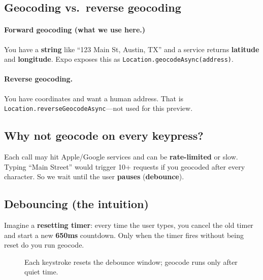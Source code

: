 \documentclass[11pt,a4paper]{article}
\begin{document}
\subsection{Geocoding vs.\ reverse geocoding}

\paragraph{Forward geocoding (what we use here.)}
You have a \textbf{string} like ``123 Main St, Austin, TX'' and a service returns \textbf{latitude} and \textbf{longitude}. Expo exposes this as \texttt{Location.geocodeAsync(address)}.

\paragraph{Reverse geocoding.}
You have coordinates and want a human address. That is \texttt{Location.reverseGeocodeAsync}---not used for this preview.

\subsection{Why not geocode on every keypress?}

Each call may hit Apple/Google services and can be \textbf{rate-limited} or slow. Typing ``Main Street'' would trigger 10+ requests if you geocoded after every character. So we wait until the user \textbf{pauses} (\textbf{debounce}).

\subsection{Debouncing (the intuition)}

Imagine a \textbf{resetting timer}: every time the user types, you cancel the old timer and start a new \textbf{650ms} countdown. Only when the timer fires without being reset do you run geocode.

\begin{figure}[h]
\centering
{}
\caption{Each keystroke resets the debounce window; geocode runs only after quiet time.}
\end{figure}
\end{document}
